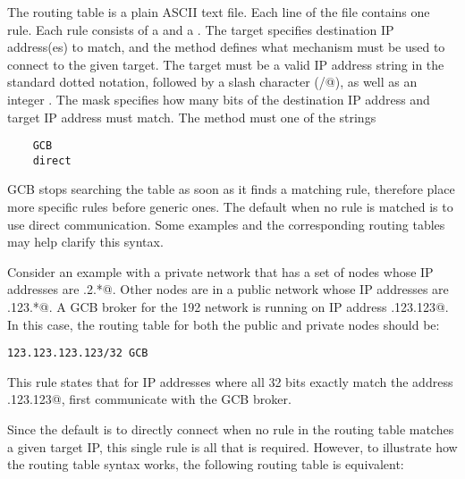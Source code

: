
The routing table is a plain ASCII text file.
Each line of the file contains one rule.
Each rule consists of a  and a .
The target specifies destination IP address(es) to match, and the method
defines what mechanism must be used to connect to the given target.
The target must be a valid IP address string in the standard
dotted notation, followed by a slash character (\verb@/@),
as well as an integer .
The mask specifies how many bits of the destination IP address
and target IP address must match.
The method must one of the strings 
\begin{verbatim}
    GCB
    direct
\end{verbatim}
GCB stops searching the table as soon as it finds a matching rule,
therefore place more specific rules before generic ones.
The default when no rule is matched is to use direct communication.
Some examples and the corresponding routing tables may help clarify
this syntax.



Consider an example with
a private network that has a set of nodes whose IP
addresses are .2.*@.
Other nodes are in a public network 
whose IP addresses are .123.*@.
A GCB broker for the 192
network is running on IP address .123.123@.
In this case, the routing table for both the public and private nodes
should be:

\begin{verbatim}
123.123.123.123/32 GCB
\end{verbatim}

This rule states that for IP addresses where all 32 bits exactly match
the address .123.123@, first communicate with the GCB broker.

Since the default is to directly connect when no rule in the routing
table matches a given target IP, this single rule is all that is
required.
However, to illustrate how the routing table syntax works, the
following routing table is equivalent:

